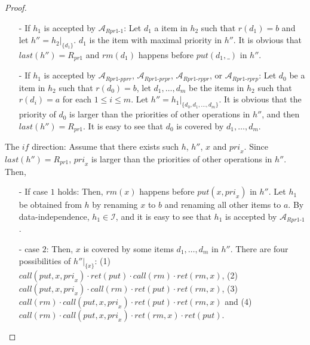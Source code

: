 \documentclass{llncs}
\begin{document}
\begin {proof}
\begin{itemize}
\setlength{\itemsep}{0.5pt}
\item[-] If $h_1$ is accepted by $\mathcal{A}_{\textit{Rpr1-1}}$: Let $d_1$ a item in $h_2$ such that $r(d_1)=b$ and let $h'' = h_2 \vert_{ \{ d_1 \} }$. $d_1$ is the item with maximal priority in $h''$. It is obvious that $\textit{last}(h'') = R_{\textit{pr1}}$ and $\textit{rm}(d_1)$ happens before $\textit{put}(d_1,\_)$ in $h''$.

\item[-] If $h_1$ is accepted by $\mathcal{A}_{\textit{Rpr1-pprr}}$, $\mathcal{A}_{\textit{Rpr1-prpr}}$, $\mathcal{A}_{\textit{Rpr1-rppr}}$, or $\mathcal{A}_{\textit{Rpr1-rprp}}$: Let $d_0$ be a item in $h_2$ such that $r(d_0)=b$, let $d_1,\ldots,d_m$ be the items in $h_2$ such that $r(d_i)=a$ for each $1 \leq i \leq m$. Let $h'' = h_1 \vert_{ \{ d_0, d_1, \ldots, d_m \} }$. It is obvious that the priority of $d_0$ is larger than the priorities of other operations in $h''$, and then $\textit{last}(h'') = R_{\textit{pr1}}$. It is easy to see that $d_0$ is covered by $d_1,\ldots,d_m$.
\end{itemize}

\noindent The $\textit{if}$ direction: Assume that there exists such $h$, $h''$, $x$ and $\textit{pri}_x$. Since $\textit{last}(h'') = R_{\textit{pr1}}$, $\textit{pri}_x$ is larger than the priorities of other operations in $h''$. Then,

\begin{itemize}
\setlength{\itemsep}{0.5pt}
\item[-] If case $1$ holds: Then, $\textit{rm}(x)$ happens before $\textit{put}(x,\textit{pri}_x)$ in $h''$. Let $h_1$ be obtained from $h$ by renaming $x$ to $b$ and renaming all other items to $a$. By data-independence, $h_1 \in \mathcal{I}$, and it is easy to see that $h_1$ is accepted by $\mathcal{A}_{\textit{Rpr1-1}}$.
\item[-] case $2$: Then, $x$ is covered by some items $d_1,\ldots,d_m$ in $h''$. There are four possibilities of $h'' \vert_{ \{ x \} }$: (1) $\textit{call}(\textit{put},x,\textit{pri}_x) \cdot \textit{ret}(\textit{put}) \cdot \textit{call}(\textit{rm}) \cdot \textit{ret}(\textit{rm},x)$, (2) $\textit{call}(\textit{put},x,\textit{pri}_x) \cdot \textit{call}(\textit{rm}) \cdot \textit{ret}(\textit{put}) \cdot \textit{ret}(\textit{rm},x)$, (3) $\textit{call}(\textit{rm}) \cdot \textit{call}(\textit{put},x,\textit{pri}_x) \cdot \textit{ret}(\textit{put}) \cdot \textit{ret}(\textit{rm},x)$ and (4) $\textit{call}(\textit{rm}) \cdot \textit{call}(\textit{put},x,\textit{pri}_x) \cdot \textit{ret}(\textit{rm},x) \cdot \textit{ret}(\textit{put})$.


\end{itemize}
\end{proof}
\end{document}
